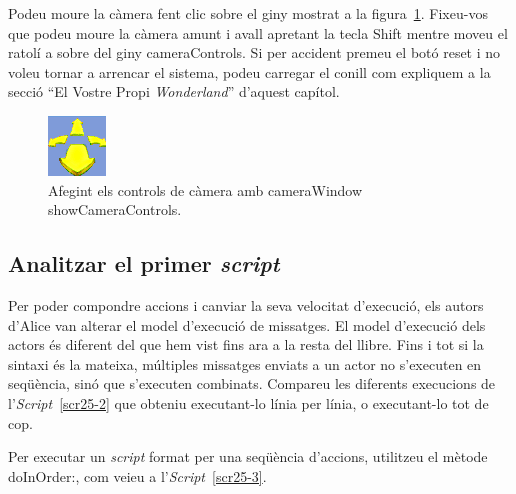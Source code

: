 Podeu moure la càmera fent clic sobre el giny mostrat a la figura~\ref{fig2508}. Fixeu-vos que podeu moure la càmera amunt i avall apretant la tecla \textsf{Shift} mentre moveu el ratolí a sobre del giny \textsf{cameraControls}. Si per accident premeu el botó \textsf{reset} i no voleu tornar a arrencar el sistema, podeu carregar el conill com expliquem a la secció ``El Vostre Propi \emph{Wonderland}'' d'aquest capítol.
\begin{figure}[h!]
\begin{center}
\includegraphics[scale=2]{Imatges/figura25-8}
\end{center}
\caption{Afegint els controls de càmera amb \textsf{\upshape cameraWindow showCameraControls}.}
\label{fig2508}
\end{figure}

\subsection{Analitzar el primer \emph{script}}
Per poder compondre accions i canviar la seva velocitat d'execució, els autors d'Alice van alterar el model d'execució de missatges. El model d'execució dels actors és diferent del que hem vist fins ara a la resta del llibre. Fins i tot si la sintaxi és la mateixa, múltiples missatges enviats a un actor no s'executen en seqüència, sinó que s'executen combinats. Compareu les diferents execucions de l'\emph{Script}~\ref{scr25-2} que obteniu executant-lo línia per línia, o executant-lo tot de cop. 

Per executar un \emph{script} format per una seqüència d'accions, utilitzeu el mètode \textsf{doInOrder:}, com veieu a l'\emph{Script}~\ref{scr25-3}.

